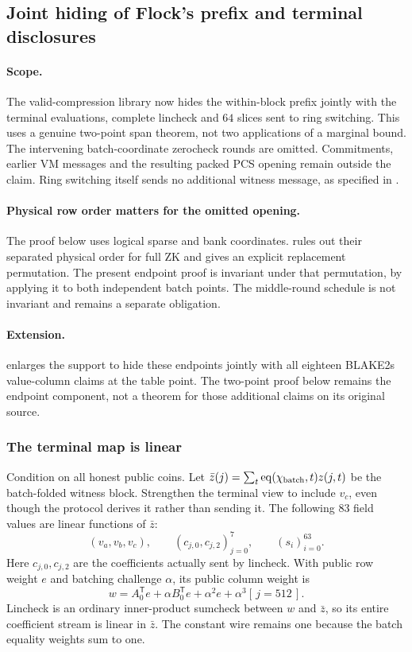 \subsection{Joint hiding of Flock's prefix and terminal disclosures}\label{note:zk-flock-endpoints}

\paragraph{Scope.} The valid-compression library now hides the within-block prefix jointly with the terminal evaluations, complete lincheck and $64$ slices sent to ring switching. This uses a genuine two-point span theorem, not two applications of a marginal bound. The intervening batch-coordinate zerocheck rounds are omitted. Commitments, earlier VM messages and the resulting packed PCS opening remain outside the claim. Ring switching itself sends no additional witness message, as specified in .

\paragraph{Physical row order matters for the omitted opening.} The proof below uses logical sparse and bank coordinates.  rules out their separated physical order for full ZK and gives an explicit replacement permutation. The present endpoint proof is invariant under that permutation, by applying it to both independent batch points. The middle-round schedule is not invariant and remains a separate obligation.

\paragraph{Extension.}  enlarges the support to hide these endpoints jointly with all eighteen BLAKE2s value-column claims at the table point. The two-point proof below remains the endpoint component, not a theorem for those additional claims on its original source.

\subsubsection{The terminal map is linear}

Condition on all honest public coins. Let $\bar z(j)=\sum_t\operatorname{eq}(\chi_{\rm batch},t)z(j,t)$ be the batch-folded witness block. Strengthen the terminal view to include $v_c$, even though the protocol derives it rather than sending it. The following $83$ field values are linear functions of $\bar z$:
\[
 (v_a,v_b,v_c),\qquad
 (c_{j,0},c_{j,2})_{j=0}^{7},\qquad
 (s_i)_{i=0}^{63}.
\]
Here $c_{j,0},c_{j,2}$ are the coefficients actually sent by lincheck. With public row weight $e$ and batching challenge $\alpha$, its public column weight is
\[
 w=A_0^{\mathsf T}e+\alpha B_0^{\mathsf T}e+\alpha^2e+\alpha^3[\,j=512\,].
\]
Lincheck is an ordinary inner-product sumcheck between $w$ and $\bar z$, so its entire coefficient stream is linear in $\bar z$. The constant wire remains one because the batch equality weights sum to one.

